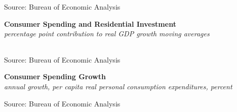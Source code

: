 \documentclass{report}
\makeatletter
\newcommand{\tbllink}[1]{\href{https://raw.githubusercontent.com/bdecon/US-chartbook/master/chartbook/data/#1}{\faTable}}
\newcommand*\short[1]{\expandafter\@gobbletwo\number\numexpr#1\relax}
\newcommand{\dateaxisticks}{
		date coordinates in=x, axis line style={draw=none},
		xmax={2023-11-30},
		max space between ticks=40,	    
		xtick={{1990-01-01}, {1992-01-01}, {1994-01-01}, 
			{1996-01-01}, {1998-01-01}, {2000-01-01}, 
			{2002-01-01}, {2004-01-01}, {2006-01-01},
			{2008-01-01}, {2010-01-01}, {2012-01-01}, {2014-01-01},
		    {2016-01-01}, {2018-01-01}, {2020-01-01}, {2022-01-01}, 
		    {2024-01-01}, {2026-01-01}},
		minor xtick={{1989-01-01}, {1991-01-01}, {1993-01-01},
			{1995-01-01}, {1997-01-01}, {1999-01-01}, 
			{2001-01-01}, {2003-01-01}, {2005-01-01}, {2007-01-01},
		    {2009-01-01}, {2011-01-01}, {2013-01-01}, {2015-01-01},
		    {2017-01-01}, {2019-01-01}, {2021-01-01}, {2023-01-01}, 
		    {2025-01-01}, {2027-01-01}},
		enlarge y limits={0.06}, enlarge x limits={0.01},
		xticklabel style={align=center, yshift=-2pt}, tick label style={inner sep=0pt},
		}
\newcommand{\bbar}[2]{extra #1 ticks = {{#2}}, extra #1 tick labels = ,
		extra #1 tick style = {grid=major, grid style={thick, black!25}},}
\newcommand{\stdline}[4]{\addplot[very thick, no markers, color=#1] 
		table [x=#2, y=#3, col sep=comma] {#4};	}
\newcommand{\rbars}{
		\fill[color=black!10] (axis cs:{1990-07-01},\pgfkeysvalueof{/pgfplots/ymin}) rectangle 
			(axis cs:{1991-03-01}, \pgfkeysvalueof{/pgfplots/ymax});
		\fill[color=black!10] (axis cs:{2007-12-01},\pgfkeysvalueof{/pgfplots/ymin}) rectangle 
			(axis cs:{2009-07-01}, \pgfkeysvalueof{/pgfplots/ymax});
		\fill[color=black!10] (axis cs:{2001-03-01},\pgfkeysvalueof{/pgfplots/ymin}) rectangle 
			(axis cs:{2001-11-01}, \pgfkeysvalueof{/pgfplots/ymax});
		\fill[color=black!10] (axis cs:{2020-02-01},\pgfkeysvalueof{/pgfplots/ymin}) rectangle 
			(axis cs:{2020-05-01}, \pgfkeysvalueof{/pgfplots/ymax});}
\makeatother
\begin{document}
{\begin{minipage}{0.76\textwidth}
\footnotesize{Source: Bureau of Economic Analysis} \hfill \tbllink{pce_ma.csv}
\vspace{2mm}

\small  
\end{minipage}
\vspace{1mm}

\begin{minipage}{0.80\textwidth}
\normalsize \textbf{Consumer Spending and Residential Investment}\\
\footnotesize{\textit{percentage point contribution to real GDP growth \hspace{34mm} moving averages}}\\
 \setlength{\tabcolsep}{3.6pt} \color{black!90}
	{\renewcommand{\arraystretch}{1.56}
\hspace*{-2mm} \begin{tabular}{p{2.0mm} p{40mm} R{8.2mm} R{8.2mm} R{8.2mm} R{8.2mm} 
					R{7.2mm} R{7.2mm} R{7.2mm}}
		 \hline
	\end{tabular}}
	\vspace{-2mm}
	
\footnotesize{Source: Bureau of Economic Analysis}
\end{minipage}
\newpage 
\vspace*{-9mm}

\begin{minipage}{0.76\textwidth}  
\small 
\vspace{1mm}

\normalsize \textbf{Consumer Spending Growth}\\
\footnotesize{\textit{annual growth, per capita real personal consumption expenditures, percent}}
\vspace{4.6cm}

\hspace{3mm} 

\footnotesize{Source: Bureau of Economic Analysis}  \hfill \tbllink{pcegrowth.csv}
\vspace{4mm}


\end{minipage}}
\end{document}
